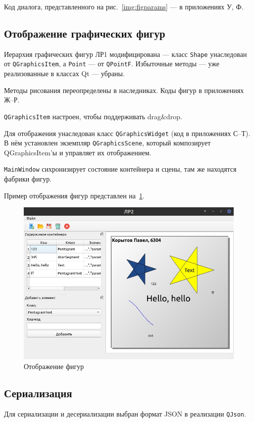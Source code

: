 \documentclass[a4paper, 14pt]{extarticle}
\begin{document}
Код диалога, представленного на рис.~\ref{img:figparams} --- в приложениях У, Ф.

\subsection{Отображение графических фигур}
Иерархия графических фигур ЛР1 модифицирована --- класс \texttt{Shape} унаследован от \texttt{QGraphicsItem}, а \texttt{Point} --- от \texttt{QPointF}. Избыточные методы --- уже реализованные в классах Qt --- убраны.

Методы рисования переопределены в наследниках. Коды фигур в приложениях Ж--Р. 

\texttt{QGraphicsItem} настроен, чтобы поддерживать drag\&drop.

Для отображения унаследован класс \texttt{QGraphicsWidget} (код в приложениях С--Т). В нём установлен экземпляр \texttt{QGraphicsScene}, который композирует QGraphicsItem'ы и управляет их отображением.

\texttt{MainWindow} сихронизирует состояние контейнера и сцены, там же находятся фабрики фигур.

Пример отображения фигур представлен на~\ref{img:figures}.

\begin{figure}[h]
    \centering
    \includegraphics[width=\textwidth]{img/IMG_005.jpg}
    \caption{Отображение фигур}%
    \label{img:figures}
\end{figure}

\subsection{Сериализация}
Для сериализации и десериализации выбран формат JSON в реализации \texttt{QJson}.
\end{document}
